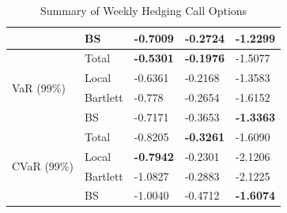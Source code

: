 \documentclass[letterpaper,12pt,titlepage,oneside,final]{book}
\numberwithin{equation}{section}
\theoremstyle{definition}
\begin{document}
\begin{table}[htp!]
\begin{tabular}{ll|l|l|l|}
    \multicolumn{1}{|l|}{}                                & BS       & -0.7009          & -0.2724          & -1.2299          \\ \hline
    \multicolumn{1}{|l|}{\multirow{4}{*}{VaR (99\%)}}     & Total    & \textbf{-0.5301} & \textbf{-0.1976} & -1.5077          \\  
    \multicolumn{1}{|l|}{}                                & Local    & -0.6361          & -0.2168          & -1.3583          \\  
    \multicolumn{1}{|l|}{}                                & Bartlett & -0.778           & -0.2654          & -1.6152          \\  
    \multicolumn{1}{|l|}{}                                & BS       & -0.7171          & -0.3653          & \textbf{-1.3363} \\ \hline
    \multicolumn{1}{|l|}{\multirow{4}{*}{CVaR (99\%)}}    & Total    & -0.8205          & \textbf{-0.3261} & -1.6090          \\  
    \multicolumn{1}{|l|}{}                                & Local    & \textbf{-0.7942} & -0.2301          & -2.1206          \\  
    \multicolumn{1}{|l|}{}                                & Bartlett & -1.0827          & -0.2883          & -2.1225          \\  
    \multicolumn{1}{|l|}{}                                & BS       & -1.0040          & -0.4712          & \textbf{-1.6074} \\ \hline
    \end{tabular}
	\caption{Summary of Weekly Hedging Call Options} \label{table:CallTotalW}
    \end{table}
\end{document}

